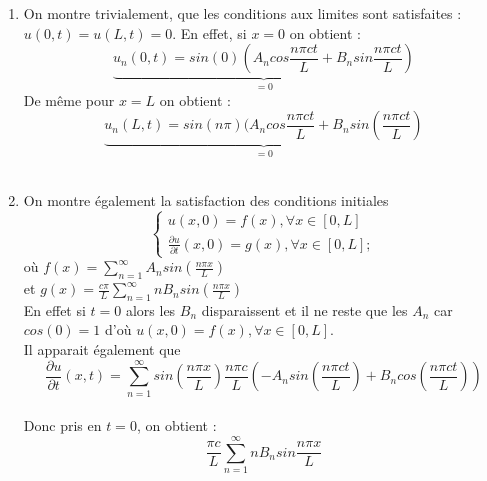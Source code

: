 \documentclass[a4paper,12pt]{report}
\begin{document}
\begin{enumerate}
		\begin{enumerate}
		\item On montre trivialement, que les conditions aux limites sont satisfaites : $u(0,t) = u(L,t) = 0$. En effet, si $x=0$ on obtient :\\
	\[
\underbrace{u_n(0, t) = sin(0)(A_n cos\frac{n\pi ct}{L} + B_n sin\frac{n\pi ct}{L})}_{\text{$=0$}}
\] 
	De m\^eme pour $x=L$ on obtient :\\
	\[
\underbrace{u_n(L, t) = sin(n\pi) (A_n cos\frac{n\pi ct}{L} + B_n sin(\frac{n\pi ct}{L})}_{\text{$=0$}}
\] \\
		\item On montre \'egalement la satisfaction des conditions initiales
\[ 
\left\{
  \begin{aligned}
 	u(x,0) = f(x), \forall x \in [0,L] \\
	\frac{\partial u}{\partial t}(x,0) = g(x), \forall x \in [0,L];
  \end{aligned}
\right.\]
o\`u $f(x) = \sum_{n=1}^{\infty}{A_n sin(\frac{n\pi x}{L})}$\\
et $g(x) =\frac{c\pi}{L} \sum_{n=1}^{\infty}{n B_n sin(\frac{n\pi x}{L})}$\\

En effet si $t=0$ alors les $B_n$ disparaissent et il ne reste que les $A_n$ car $cos(0) =1$ d'o\`u $u(x,0) = f(x), \forall x \in [0,L]$. \\
Il apparait \'egalement que 
$$\frac{\partial u}{\partial t}(x,t) = \sum_{n=1}^{\infty}sin(\frac{n\pi x}{L}) \frac{n\pi c}{L}(-A_n sin(\frac{n\pi ct}{L}) + B_n cos(\frac{n\pi ct}{L})) $$\\
Donc pris en $t = 0$, on obtient :
$$\frac{\pi c}{L}\sum_{n=1}^{\infty}nB_n sin\frac{n\pi x}{L}$$
\end{enumerate}\newpage


\end{enumerate}
\end{document}

